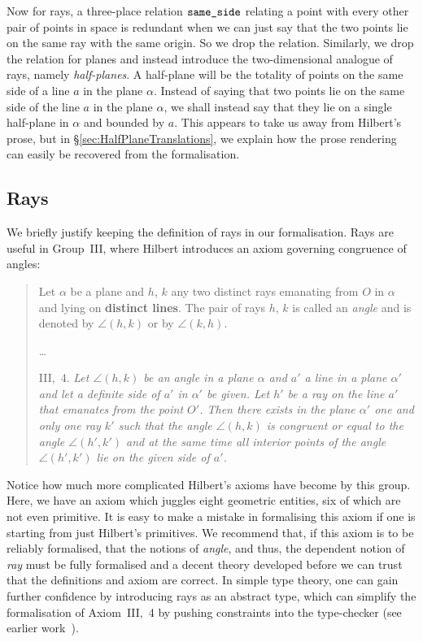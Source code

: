 Now for rays, a three-place relation $\texttt{same\_side}$
relating a point with every other pair of points in space is redundant when we can just say that the two points lie on the same ray with the same origin. So we drop the relation. Similarly, we drop the relation for planes and instead introduce the two-dimensional analogue of rays, namely \emph{half-planes}. A half-plane will be the totality of points on the same side of a line $a$ in the plane $\alpha$. Instead of saying that two points lie on the same side of the line $a$ in the plane $\alpha$, we shall instead say that they lie on a single half-plane in $\alpha$ and bounded by $a$. This appears to take us away from Hilbert's prose, but in \S\ref{sec:HalfPlaneTranslations}, we explain how the prose rendering can easily be recovered from the formalisation.

\subsection{Rays}\label{sec:RaysDef}
We briefly justify keeping the definition of rays in our formalisation. Rays are useful in Group~III, where Hilbert introduces an axiom governing congruence of angles:

\begin{quotation}
  Let $\alpha$ be a plane and $h$, $k$ any two distinct rays emanating from $O$ in $\alpha$ and lying on {\bfseries distinct lines}. The pair of rays $h$, $k$ is called an \emph{angle} and is denoted by $\angle(h,k)$ or by $\angle(k,h)$.

\ldots

III,~4. \emph{Let $\angle (h,k)$ be an angle in a plane $\alpha$ and $a'$ a line in a plane $\alpha'$ and let a definite side of $a'$ in $\alpha'$ be given. Let $h'$ be a ray on the line $a'$ that emanates from the point $O'$. Then there exists in the plane $\alpha'$ one and only one ray $k'$ such that the angle $\angle (h,k)$ is congruent or equal to the angle $\angle (h',k')$ and at the same time all interior points of the angle $\angle (h',k')$ lie on the given side of $a'$.}
\end{quotation}

Notice how much more complicated Hilbert's axioms have become by this group. Here, we have an axiom which juggles eight geometric entities, six of which are not even primitive. It is easy to make a mistake in formalising this axiom if one is starting from just Hilbert's primitives. We recommend that, if this axiom is to be reliably formalised, that the notions of \emph{angle}, and thus, the dependent notion of \emph{ray} must be fully formalised and a decent theory developed before we can trust that the definitions and axiom are correct. In simple type theory, one can gain further confidence by introducing rays as an abstract type, which can simplify the formalisation of Axiom~III,~4 by pushing constraints into the type-checker (see earlier work~\cite{ScottMScThesis}). 

